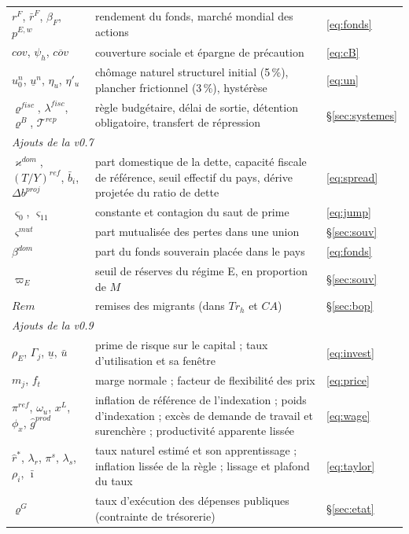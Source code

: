 \documentclass[11pt,a4paper]{article}
\begin{document}
\begin{longtable}{p{4.3cm}p{7.8cm}p{3.3cm}}
$r^F$, $\bar r^F$, $\beta_F$, $p^{E,w}$ & rendement du fonds, marché mondial des actions & \eqref{eq:fonds}\\
$cov$, $\psi_h$, $\overline{cov}$ & couverture sociale et épargne de précaution & \eqref{eq:cB}\\
$u^n_0$, $\underline u^n$, $\eta_u$, $\eta'_u$ & chômage naturel structurel initial (5\,\%), plancher frictionnel (3\,\%), hystérèse & \eqref{eq:un}\\
$\varrho^{fisc}$, $\lambda^{fisc}$, $\varrho^B$, $\mathcal{T}^{rep}$ & règle budgétaire, délai de sortie, détention obligatoire, transfert de répression & \S\ref{sec:systemes}\\
\midrule
\multicolumn{3}{l}{\emph{Ajouts de la v0.7}}\\
$\varkappa^{dom}$, $(T/Y)^{ref}$, $\bar b_i$, $\Delta b^{proj}$ & part domestique de la dette, capacité fiscale de référence, seuil effectif du pays, dérive projetée du ratio de dette & \eqref{eq:spread}\\
$\varsigma_0$, $\varsigma_{11}$ & constante et contagion du saut de prime & \eqref{eq:jump}\\
$\varsigma^{mut}$ & part mutualisée des pertes dans une union & \S\ref{sec:souv}\\
$\beta^{dom}$ & part du fonds souverain placée dans le pays & \eqref{eq:fonds}\\
$\varpi_E$ & seuil de réserves du régime E, en proportion de $M$ & \S\ref{sec:souv}\\
$Rem$ & remises des migrants (dans $Tr_h$ et $CA$) & \S\ref{sec:bop}\\
\midrule
\multicolumn{3}{l}{\emph{Ajouts de la v0.9}}\\
$\rho_E$, $\Gamma_j$, $\underline u$, $\bar u$ & prime de risque sur le capital ; taux d'utilisation et sa fenêtre & \eqref{eq:invest}\\
$m_j$, $f_t$ & marge normale ; facteur de flexibilité des prix & \eqref{eq:price}\\
$\pi^{ref}$, $\omega_u$, $x^L$, $\phi_x$, $\hat g^{prod}$ & inflation de référence de l'indexation ; poids d'indexation ; excès de demande de travail et surenchère ; productivité apparente lissée & \eqref{eq:wage}\\
$\hat r^\ast$, $\lambda_r$, $\pi^s$, $\lambda_s$, $\rho_i$, $\bar\imath$ & taux naturel estimé et son apprentissage ; inflation lissée de la règle ; lissage et plafond du taux & \eqref{eq:taylor}\\
$\varrho^G$ & taux d'exécution des dépenses publiques (contrainte de trésorerie) & \S\ref{sec:etat}\\

\end{longtable}
\end{document}
